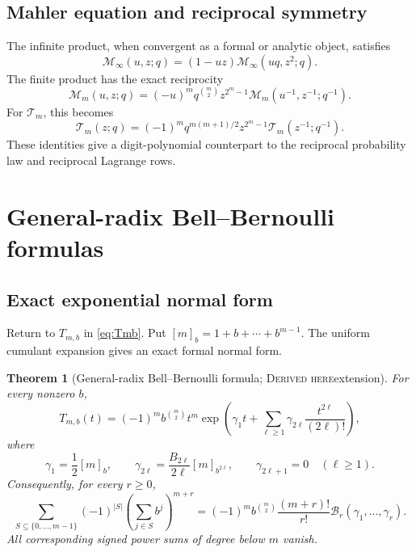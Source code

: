 \documentclass[11pt,oneside]{article}
\newtheorem{theorem}{Theorem}[section]
\theoremstyle{definition}
\theoremstyle{remark}
\newcommand{\Bell}{\mathcal B}
\newcommand{\Derived}{\textsc{Derived here}}
\begin{document}
\subsection{Mahler equation and reciprocal symmetry}
The infinite product, when convergent as a formal or analytic object, satisfies
\begin{equation}\label{eq:master-mahler}
 \mathcal M_\infty(u,z;q)
 =(1-uz)\mathcal M_\infty(uq,z^2;q).
\end{equation}
The finite product has the exact reciprocity
\begin{equation}\label{eq:master-reciprocity}
 \mathcal M_m(u,z;q)
 =(-u)^mq^{\binom m2}z^{2^m-1}
 \mathcal M_m(u^{-1},z^{-1};q^{-1}).
\end{equation}
For \(\mathcal T_m\), this becomes
\begin{equation}\label{eq:T-reciprocity}
 \mathcal T_m(z;q)=(-1)^mq^{m(m+1)/2}z^{2^m-1}
 \mathcal T_m(z^{-1};q^{-1}).
\end{equation}
These identities give a digit-polynomial counterpart to the reciprocal
probability law and reciprocal Lagrange rows.

\section{General-radix Bell--Bernoulli formulas}

\subsection{Exact exponential normal form}
Return to \(T_{m,b}\) in \eqref{eq:Tmb}.  Put
\([m]_b=1+b+\cdots+b^{m-1}\).  The uniform cumulant expansion gives an exact
formal normal form.

\begin{theorem}[General-radix Bell--Bernoulli formula; \Derived extension]
For every nonzero \(b\),
\begin{equation}\label{eq:T-normal-form}
 T_{m,b}(t)=(-1)^mb^{\binom m2}t^m
 \exp\left(\gamma_1t+
 \sum_{\ell\ge1}\gamma_{2\ell}\frac{t^{2\ell}}{(2\ell)!}\right),
\end{equation}
where
\begin{equation}\label{eq:gamma}
 \gamma_1=\frac12[m]_b,
 \qquad
 \gamma_{2\ell}=\frac{B_{2\ell}}{2\ell}[m]_{b^{2\ell}},
 \qquad
 \gamma_{2\ell+1}=0\quad(\ell\ge1).
\end{equation}
Consequently, for every \(r\ge0\),
\begin{equation}\label{eq:radix-moment-sum}
 \sum_{S\subseteq\{0,\ldots,m-1\}}(-1)^{|S|}
 \left(\sum_{j\in S}b^j\right)^{m+r}
 =(-1)^mb^{\binom m2}\frac{(m+r)!}{r!}
 \Bell_r(\gamma_1,\ldots,\gamma_r).
\end{equation}
All corresponding signed power sums of degree below \(m\) vanish.
\end{theorem}
\end{document}
